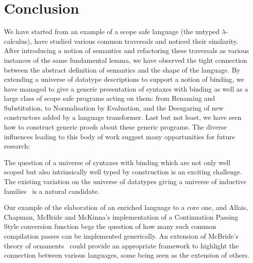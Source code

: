 \section{Conclusion}

We have started from an example of a scope safe language (the
untyped $\lambda$-calculus), have studied various common traversals
and noticed their similarity. After introducing a notion of semantics
and refactoring these traversals as various instances of the same
fundamental lemma, we have observed the tight connection between the
abstract definition of semantics and the shape of the language. By
extending a universe of datatype descriptions to support a notion of
binding, we have managed to give a generic presentation of syntaxes
with binding as well as a large class of scope safe programs acting
on them: from Renaming and Substitution, to Normalisation by Evaluation,
and the Desugaring of new constructors added by a language transformer.
Last but not least, we have seen how to construct generic proofs about
these generic programs. The diverse influences leading to this body of
work suggest many opportunities for future research:

The question of a universe of syntaxes with binding which are not only
well scoped but also intrinsically well typed by construction is an
exciting challenge. The existing variation on the universe of datatypes
giving a universe of inductive families~\cite{dybjer1994inductive}
is a natural candidate.

Our example of the elaboration of an enriched language to a core one,
and Allais, Chapman, McBride and McKinna's implementation of a
Continuation Passing Style conversion function begs the question of how
many such common compilation passes can be implemented generically.
An extension of McBride's theory of ornaments~\citeyear{mcbride2010ornamental}
could provide an appropriate framework to highlight the connection
between various languages, some being seen as the extension of others.

\newpage
